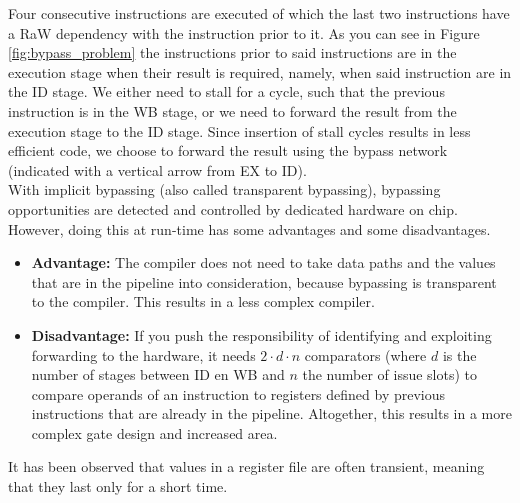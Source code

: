 Four consecutive instructions are executed of which the last two instructions have a RaW dependency with the instruction prior to it. As you can see in Figure \ref{fig:bypass_problem} the instructions prior to said instructions are in the execution stage when their result is required, namely, when said instruction are in the ID stage. We either need to stall for a cycle, such that the previous instruction is in the WB stage, or we need to forward the result from the execution stage to the ID stage. Since insertion of stall cycles results in less efficient code, we choose to forward the result using the bypass network (indicated with a vertical arrow from EX to ID).\\


With implicit bypassing (also called transparent bypassing), bypassing opportunities are detected and controlled by dedicated hardware on chip. However, doing this at run-time has some advantages and some disadvantages.
\begin{itemize}
\item \textbf{Advantage:} The compiler does not need to take data paths and the values that are in the pipeline into consideration, because bypassing is transparent to the compiler. This results in a less complex compiler.
\item \textbf{Disadvantage:} 
If you push the responsibility of identifying and exploiting forwarding to the hardware, it needs $2\cdot d\cdot n$ comparators (where $d$ is the number of stages between ID en WB and $n$ the number of issue slots) to compare operands of an instruction to registers defined by previous instructions that are already in the pipeline. Altogether, this results in a more complex gate design and increased area.
\end{itemize}

It has been observed that values in a register file are often transient, meaning that they last only for a short time.  









